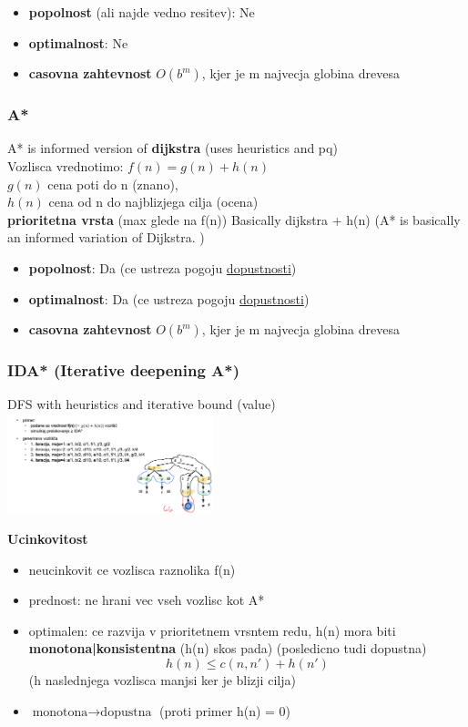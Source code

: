 \begin{itemize}[noitemsep,topsep=0pt,leftmargin=*]
    \item \textbf{popolnost} (ali najde vedno resitev): Ne
    \item \textbf{optimalnost}: Ne
    \item \textbf{casovna zahtevnost} $O(b^m)$, kjer je m najvecja globina drevesa
\end{itemize}

\subsubsection{A*}
A* is informed version of \textbf{dijkstra} (uses heuristics and pq)\\
Vozlisca vrednotimo: $f(n)=g(n)+h(n)$\\ 
$g(n)$ cena poti do n (znano),\\ 
$h(n)$ cena od n do najblizjega cilja (ocena)\\
\textbf{prioritetna vrsta} (max glede na f(n))
Basically dijkstra + h(n) (A* is basically an informed variation of Dijkstra.
)
\begin{itemize}[noitemsep,topsep=0pt,leftmargin=*]
    \item \textbf{popolnost}: Da (ce ustreza pogoju \underline{dopustnosti})
    \item \textbf{optimalnost}: Da (ce ustreza pogoju \underline{dopustnosti}) 
    \item \textbf{casovna zahtevnost} $O(b^m)$, kjer je m najvecja globina drevesa
\end{itemize}


\subsubsection{IDA* (Iterative deepening A*)}
DFS with heuristics and iterative bound (value)\\

\includegraphics[width=6cm]{./images/ida*.png}

\textbf{Ucinkovitost}
\begin{itemize}[noitemsep,topsep=0pt,leftmargin=*]
    \item neucinkovit ce vozlisca raznolika f(n)
    \item prednost: ne hrani vec vseh vozlisc kot A*
    \item optimalen: ce razvija v prioritetnem vrsntem redu, h(n) mora biti \textbf{monotona|konsistentna} (h(n) skos pada) (posledicno tudi dopustna) $$h(n) \leq c(n,n') + h(n')$$ (h naslednjega vozlisca manjsi ker je blizji cilja)
    \item $\text{monotona} \rightarrow \text{dopustna}$ (proti primer h(n) = 0)
\end{itemize}


